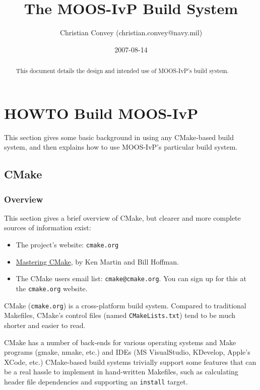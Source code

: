 \documentclass[letterpaper,10pt]{article}
\title{The MOOS-IvP Build System}
\author{Christian Convey (christian.convey@navy.mil)}
\date{2007-08-14}
\begin{document}
\maketitle

\begin{abstract}
This document details the design and intended use of MOOS-IvP's build system.
\end{abstract}

\tableofcontents

\parskip 7.2pt           %

\section{HOWTO Build MOOS-IvP}
This section gives some basic background in using any CMake-based build system,
and then explains how to use MOOS-IvP's particular build system.

\subsection{CMake}

\subsubsection{Overview}
This section gives a brief overview of CMake, but clearer and more complete sources
of information exist:
\begin{itemize}
 \item The project's website: \verb|cmake.org|
 \item \underline{Mastering CMake}, by Ken Martin and Bill Hoffman.
 \item The CMake users email list: \verb|cmake@cmake.org|.  You can sign up
   for this at the \verb|cmake.org| website.
\end{itemize}


CMake (\verb|cmake.org|) is a cross-platform build system.  Compared to traditional 
Makefiles, CMake's control files (named \verb|CMakeLists.txt|) tend to be much shorter
and easier to read.

CMake has a number of back-ends for various operating systems and Make programs
(gmake, nmake, etc.) and IDEs (MS VisualStudio, KDevelop, Apple's XCode, etc.)
CMake-based build systems trivially support some features that can be a real
hassle to implement in hand-written Makefiles, such as calculating header file
dependencies and supporting an \verb|install| target.
\end{document}
